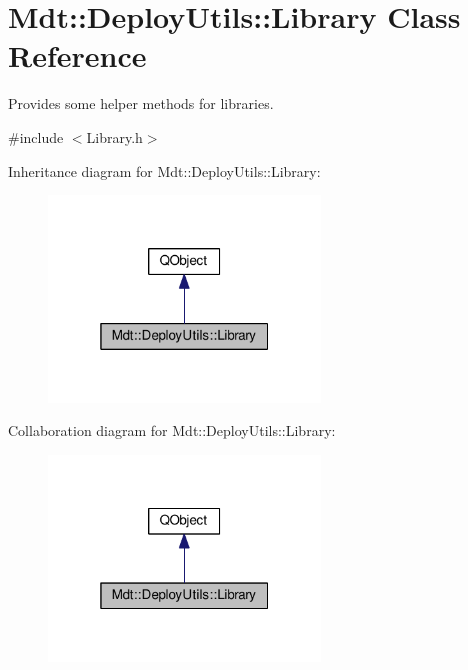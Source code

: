 \hypertarget{class_mdt_1_1_deploy_utils_1_1_library}{}\section{Mdt\+:\+:Deploy\+Utils\+:\+:Library Class Reference}
\label{class_mdt_1_1_deploy_utils_1_1_library}


Provides some helper methods for libraries.  




{\ttfamily \#include $<$Library.\+h$>$}



Inheritance diagram for Mdt\+:\+:Deploy\+Utils\+:\+:Library\+:
\nopagebreak
\begin{figure}[H]
\begin{center}
\leavevmode
\includegraphics[width=205pt]{class_mdt_1_1_deploy_utils_1_1_library__inherit__graph}
\end{center}
\end{figure}


Collaboration diagram for Mdt\+:\+:Deploy\+Utils\+:\+:Library\+:
\nopagebreak
\begin{figure}[H]
\begin{center}
\leavevmode
\includegraphics[width=205pt]{class_mdt_1_1_deploy_utils_1_1_library__coll__graph}
\end{center}
\end{figure}
